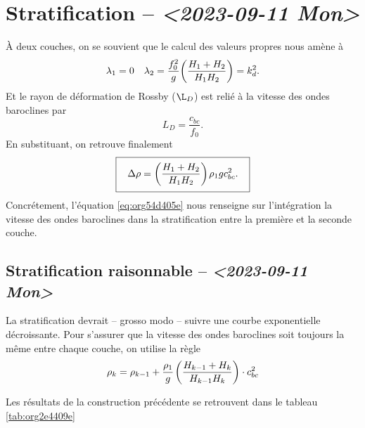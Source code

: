 \documentclass[10pt]{article}
\numberwithin{equation}{section}
\newcommand{\venti}{\vphantom{\sum_x^x}}
\newcommand{\pt}{\hspace{1pt}} %
\begin{document}
\section{Stratification -- \textit{<2023-09-11 Mon>}}
\label{sec:org3eb19af}
À deux couches, on se souvient que le calcul des valeurs propres nous amène à
\begin{align}
   && \lambda_1 = 0 && \lambda_2 = \frac{f_0^2}{g} \qty(\frac{H_1+H_2}{H_1 H_2}) = k_d^2. &&
\end{align}
Et le rayon de déformation de Rossby (\(\L_D\)) est relié à la vitesse des ondes baroclines par
\begin{equation}
   L_D = \frac{c_{bc}}{f_0}.
\end{equation}
En substituant, on retrouve finalement
\begin{equation}
\label{eq:org54d405e}
   \boxed{\hspace{0.3cm}\Delta\rho = \qty(\frac{H_1+H_2}{H_1H_2})\pt\rho_1 g c_{bc}^2.\venti\hspace{0.3cm}}
\end{equation}
Concrétement, l'équation \ref{eq:org54d405e} nous renseigne sur l'intégration la vitesse des ondes baroclines dans la stratification entre la première et la seconde couche.
\subsection{Stratification raisonnable -- \textit{<2023-09-11 Mon>}}
\label{sec:org86870c5}
La stratification devrait -- grosso modo -- suivre une courbe exponentielle décroissante.
Pour s'assurer que la vitesse des ondes baroclines soit toujours la même entre chaque couche, on utilise la règle
\begin{equation}
   \rho_k = \rho_{k-1} + \frac{\rho_1}{g}\pt\qty(\frac{H_{k-1}+H_k}{H_{k-1}H_k})\cdot c_{bc}^2
\end{equation}

Les résultats de la construction précédente se retrouvent dans le tableau \ref{tab:org2e4409e}
\end{document}
